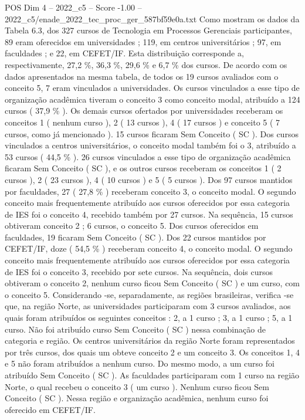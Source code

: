 \begin{textsample}{POS Dim 4 – 2022\_c5 – Score -1.00 – 2022\_c5/enade\_2022\_tec\_proc\_ger\_587bf59e0a.txt}
Como mostram os dados da Tabela 6.3, dos 327 cursos de Tecnologia em Processos Gerenciais participantes, 89 eram oferecidos em universidades ; 119, em centros universitários ; 97, em faculdades ; e 22, em CEFET/IF.
Esta distribuição corresponde a, respectivamente, 27,2 \%, 36,3 \%, 29,6 \% e 6,7 \% dos cursos.
De acordo com os dados apresentados na mesma tabela, de todos os 19 cursos avaliados com o conceito 5, 7 eram vinculados a universidades.
Os cursos vinculados a esse tipo de organização acadêmica tiveram o conceito 3 como conceito modal, atribuído a 124 cursos ( 37,9 \% ).
Os demais cursos ofertados por universidades receberam os conceitos 1 ( nenhum curso ), 2 ( 13 cursos ), 4 ( 17 cursos ) e conceito 5 ( 7 cursos, como já mencionado ). 15 cursos ficaram Sem Conceito ( SC ).
Dos cursos vinculados a centros universitários, o conceito modal também foi o 3, atribuído a 53 cursos ( 44,5 \% ). 26 cursos vinculados a esse tipo de organização acadêmica ficaram Sem Conceito ( SC ), e os outros cursos receberam os conceitos 1 ( 2 cursos ), 2 ( 23 cursos ), 4 ( 10 cursos ) e 5 ( 5 cursos ).
Dos 97 cursos mantidos por faculdades, 27 ( 27,8 \% ) receberam conceito 3, o conceito modal.
O segundo conceito mais frequentemente atribuído aos cursos oferecidos por essa categoria de IES foi o conceito 4, recebido também por 27 cursos.
Na sequência, 15 cursos obtiveram conceito 2 ; 6 cursos, o conceito 5.
Dos cursos oferecidos em faculdades, 19 ficaram Sem Conceito ( SC ).
Dos 22 cursos mantidos por CEFET/IF, doze ( 54,5 \% ) receberam conceito 4, o conceito modal.
O segundo conceito mais frequentemente atribuído aos cursos oferecidos por essa categoria de IES foi o conceito 3, recebido por sete cursos.
Na sequência, dois cursos obtiveram o conceito 2, nenhum curso ficou Sem Conceito ( SC ) e um curso, com o conceito 5.
Considerando -se, separadamente, as regiões brasileiras, verifica -se que, na região Norte, as universidades participaram com 3 cursos avaliados, aos quais foram atribuídos os seguintes conceitos : 2, a 1 curso ; 3, a 1 curso ; 5, a 1 curso.
Não foi atribuído curso Sem Conceito ( SC ) nessa combinação de categoria e região.
Os centros universitários da região Norte foram representados por três cursos, dos quais um obteve conceito 2 e um conceito 3.
Os conceitos 1, 4 e 5 não foram atribuídos a nenhum curso.
Do mesmo modo, a um curso foi atribuído Sem Conceito ( SC ).
As faculdades participaram com 1 curso na região Norte, o qual recebeu o conceito 3 ( um curso ).
Nenhum curso ficou Sem Conceito ( SC ).
Nessa região e organização acadêmica, nenhum curso foi oferecido em CEFET/IF.

\end{textsample}
